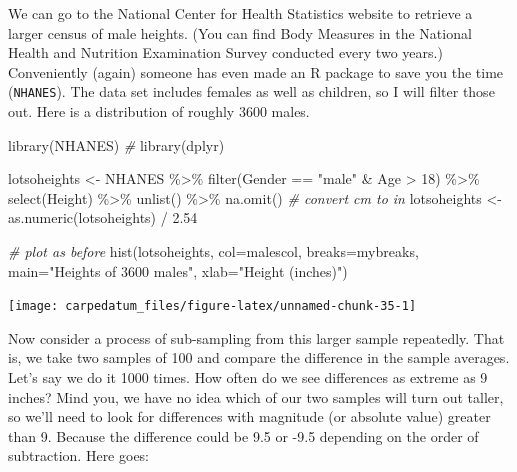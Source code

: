 \documentclass[
  openany]{book}
\newenvironment{Shaded}{\begin{snugshade}}{\end{snugshade}}
\newcommand{\AttributeTok}[1]{\textcolor[rgb]{0.77,0.63,0.00}{#1}}
\newcommand{\CommentTok}[1]{\textcolor[rgb]{0.56,0.35,0.01}{\textit{#1}}}
\newcommand{\DecValTok}[1]{\textcolor[rgb]{0.00,0.00,0.81}{#1}}
\newcommand{\FloatTok}[1]{\textcolor[rgb]{0.00,0.00,0.81}{#1}}
\newcommand{\FunctionTok}[1]{\textcolor[rgb]{0.00,0.00,0.00}{#1}}
\newcommand{\NormalTok}[1]{#1}
\newcommand{\OtherTok}[1]{\textcolor[rgb]{0.56,0.35,0.01}{#1}}
\newcommand{\SpecialCharTok}[1]{\textcolor[rgb]{0.00,0.00,0.00}{#1}}
\newcommand{\StringTok}[1]{\textcolor[rgb]{0.31,0.60,0.02}{#1}}
\begin{document}
We can go to the National Center for Health Statistics website to retrieve a larger census of male heights. (You can find Body Measures in the National Health and Nutrition Examination Survey conducted every two years.) Conveniently (again) someone has even made an R package to save you the time (\texttt{NHANES}). The data set includes females as well as children, so I will filter those out. Here is a distribution of roughly 3600 males.

\begin{Shaded}
\begin{Highlighting}[]
\FunctionTok{library}\NormalTok{(NHANES) }\CommentTok{\#}
\FunctionTok{library}\NormalTok{(dplyr)}

\NormalTok{lotsoheights }\OtherTok{\textless{}{-}}\NormalTok{ NHANES }\SpecialCharTok{\%\textgreater{}\%} \FunctionTok{filter}\NormalTok{(Gender }\SpecialCharTok{==} \StringTok{"male"} \SpecialCharTok{\&}\NormalTok{ Age }\SpecialCharTok{\textgreater{}} \DecValTok{18}\NormalTok{) }\SpecialCharTok{\%\textgreater{}\%}
                                \FunctionTok{select}\NormalTok{(Height) }\SpecialCharTok{\%\textgreater{}\%} \FunctionTok{unlist}\NormalTok{() }\SpecialCharTok{\%\textgreater{}\%} \FunctionTok{na.omit}\NormalTok{()}
\CommentTok{\# convert cm to in}
\NormalTok{lotsoheights }\OtherTok{\textless{}{-}} \FunctionTok{as.numeric}\NormalTok{(lotsoheights) }\SpecialCharTok{/} \FloatTok{2.54}

\CommentTok{\# plot as before}
\FunctionTok{hist}\NormalTok{(lotsoheights, }\AttributeTok{col=}\NormalTok{malescol, }\AttributeTok{breaks=}\NormalTok{mybreaks, }
          \AttributeTok{main=}\StringTok{"Heights of 3600 males"}\NormalTok{, }\AttributeTok{xlab=}\StringTok{"Height (inches)"}\NormalTok{)}
\end{Highlighting}
\end{Shaded}

\begin{center}\texttt{[image: carpedatum\_files/figure-latex/unnamed-chunk-35-1]} \end{center}

Now consider a process of sub-sampling from this larger sample repeatedly. That is, we take two samples of 100 and compare the difference in the sample averages. Let's say we do it 1000 times. How often do we see differences as extreme as 9 inches? Mind you, we have no idea which of our two samples will turn out taller, so we'll need to look for differences with magnitude (or absolute value) greater than 9. Because the difference could be 9.5 or -9.5 depending on the order of subtraction. Here goes:
\end{document}
